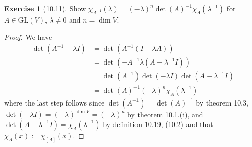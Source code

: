 \documentclass[reqno]{amsart}
\theoremstyle{definition}
\newtheorem{exercise}[theorem]{Exercise}
\theoremstyle{remark}
\begin{document}
    \begin{exercise}[10.11]
        Show $\chi_{A^{-1}} \left( \lambda \right) 
        = \left( - \lambda \right)^{n}
        \det (A)^{-1} \chi_{A} \left( \lambda^{-1} \right) $ 
        for $A \in \text{GL} (V)$, $\lambda \neq 0$ and
        $n = \dim V$.
    \end{exercise}

    \begin{proof}
        We have
        \begin{align*}
            \det \left( A^{-1} - \lambda I \right) 
            &= \det \left( A^{-1} \left( 
            I - \lambda A \right)  \right) \\
            &= \det \left( - A^{-1} \lambda 
            \left( A - \lambda^{-1} I  \right) \right) \\
            &= \det (A^{-1}) \det (- \lambda I) \det
            \left( A - \lambda^{-1} I \right) \tag{Thm 10.1.(ii)}\\
            &= \det(A)^{-1} \left( - \lambda \right)^{n}
            \chi_{A}\left( \lambda^{-1} \right) 
        \end{align*}
        where the last step follows since
        $\det \left( A^{-1} \right) =
        \det (A)^{-1}$ by theorem 10.3,
        $\det \left( - \lambda I \right) 
        = \left( - \lambda \right)^{\dim V}=
        \left( - \lambda \right)^{n}$ by
        theorem 10.1.(i), and
        $\det \left( A - \lambda^{-1}I \right) 
        = \chi_{A} (\lambda^{-1})$ by definition
        10.19, (10.2) and that
        $\chi_A (x) := \chi_{\left[ A \right] }(x)$.
    \end{proof}
    









\end{document}
